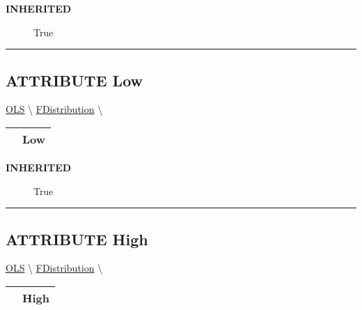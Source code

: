 \par

\par
\begin{description}
\item [\colorbox{tagtype}{\color{white} \textbf{\textsf{INHERITED}}}] \textbf{\underline{}} True
\end{description}

\rule{\linewidth}{0.5pt}
\subsection*{\textsf{\colorbox{headtoc}{\color{white} ATTRIBUTE}
Low}}

\hypertarget{ecldoc:linearregression.ols.fdistribution.low}{}
\hspace{0pt} \hyperlink{ecldoc:linearregression.ols}{OLS} \textbackslash 
\hspace{0pt} \hyperlink{ecldoc:linearregression.ols.fdistribution}{FDistribution} \textbackslash 

{\renewcommand{\arraystretch}{1.5}
\begin{tabularx}{\textwidth}{|>{\raggedright\arraybackslash}l|X|}
\hline
\hspace{0pt}\mytexttt{\color{red} } & \textbf{Low} \\
\hline
\end{tabularx}
}

\par

\par
\begin{description}
\item [\colorbox{tagtype}{\color{white} \textbf{\textsf{INHERITED}}}] \textbf{\underline{}} True
\end{description}

\rule{\linewidth}{0.5pt}
\subsection*{\textsf{\colorbox{headtoc}{\color{white} ATTRIBUTE}
High}}

\hypertarget{ecldoc:linearregression.ols.fdistribution.high}{}
\hspace{0pt} \hyperlink{ecldoc:linearregression.ols}{OLS} \textbackslash 
\hspace{0pt} \hyperlink{ecldoc:linearregression.ols.fdistribution}{FDistribution} \textbackslash 

{\renewcommand{\arraystretch}{1.5}
\begin{tabularx}{\textwidth}{|>{\raggedright\arraybackslash}l|X|}
\hline
\hspace{0pt}\mytexttt{\color{red} } & \textbf{High} \\
\hline
\end{tabularx}
}


